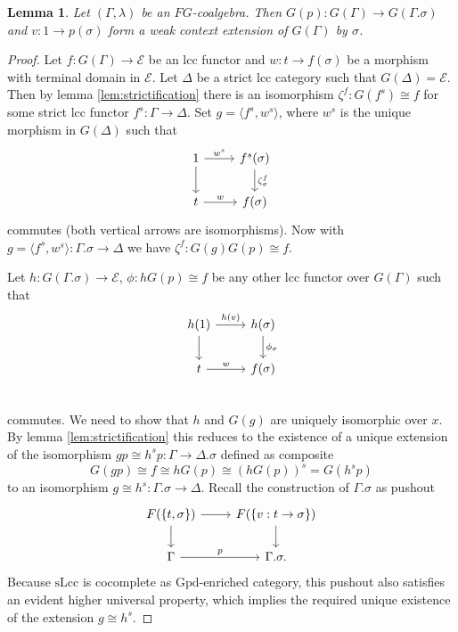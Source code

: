 \documentclass[a4paper]{article}
\newtheorem{lemma}[theorem]{Lemma}
\theoremstyle{remark}
\theoremstyle{definition}
\begin{document}
\begin{lemma}
  \label{lem:strict-ext-is-weak-ext}
  Let $(\Gamma, \lambda)$ be an $FG$-coalgebra.
  Then $G(p) : G(\Gamma) \rightarrow G(\Gamma.\sigma)$ and $v : 1 \rightarrow p(\sigma)$ form a weak context extension of $G(\Gamma)$ by $\sigma$.
\end{lemma}
\begin{proof}
  Let $f : G(\Gamma) \rightarrow \mathcal{E}$ be an lcc functor and $w : t \rightarrow  f(\sigma)$ be a morphism with terminal domain in $\mathcal{E}$.
  Let $\Delta$ be a strict lcc category such that $G(\Delta) = \mathcal{E}$.
  Then by lemma \ref{lem:strictification} there is an isomorphism $\zeta^f : G(f^s) \cong f$ for some strict lcc functor $f^s : \Gamma \rightarrow \Delta$.
  Set $g = \langle f^s, w^s \rangle$, where $w^s$ is the unique morphism in $G(\Delta)$ such that
  \begin{equation}
    \begin{tikzcd}
      1 \arrow[d] \arrow[r, "w^s"] & f^s(\sigma) \arrow[d, "\zeta^f_\sigma"] \\
      t \arrow[r, "w"] & f(\sigma)
    \end{tikzcd}
  \end{equation}
  commutes (both vertical arrows are isomorphisms).
  Now with $g = \langle f^s, w^s \rangle : \Gamma.\sigma \rightarrow \Delta$ we have $\zeta^f : G(g) G(p) \cong f$.

  Let $h : G(\Gamma.\sigma) \rightarrow \mathcal{E}$, $\phi : h G(p) \cong f$ be any other lcc functor over $G(\Gamma)$ such that
  \begin{equation}
    \begin{tikzcd}
      h(1) \arrow[d] \arrow[r, "h(v)"] & h(\sigma) \arrow[d, "\phi_\sigma"] \\
      t \arrow[r, "w"] & f(\sigma) \\
    \end{tikzcd}
  \end{equation}
  commutes.
  We need to show that $h$ and $G(g)$ are uniquely isomorphic over $x$.
  By lemma \ref{lem:strictification} this reduces to the existence of a unique extension of the isomorphism $g p \cong h^s p : \Gamma \rightarrow \Delta.\sigma$ defined as composite
  \begin{equation}
    G(gp) \cong f \cong h G(p) \cong (h G(p))^s = G(h^s p)
  \end{equation}
  to an isomorphism $g \cong h^s : \Gamma.\sigma \rightarrow \Delta$.
  Recall the construction of $\Gamma.\sigma$ as pushout
  \begin{equation}
    \begin{tikzcd}
      F(\{ t, \sigma \}) \arrow[d] \arrow[r] & F(\{ v : t \rightarrow \sigma \}) \arrow[d] \\
      \Gamma \arrow[r, "p"] & \Gamma.\sigma.
    \end{tikzcd}
  \end{equation}
  Because $\mathrm{sLcc}$ is cocomplete as $\mathrm{Gpd}$-enriched category, this pushout also satisfies an evident higher universal property, which implies the required unique existence of the extension $g \cong h^s$.
\end{proof}
\end{document}
